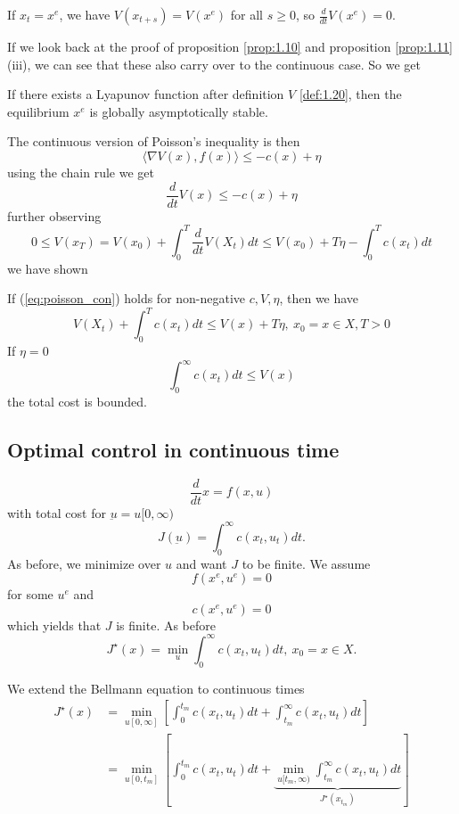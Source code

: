 If \(x_t=x^e\), we have \(V(x_{t+s})=V(x^e)\) for all \(s\geq 0\), so 
\(\frac{d}{dt}V(x^e)=0\).

If we look back at the proof of proposition \ref{prop:1.10} and proposition \ref{prop:1.11} (iii),
we can see that these also carry over to the continuous case. So we get 
\begin{proposition}\label{prop:1.21}
    If there exists a Lyapunov function after definition \(V\) \ref{def:1.20},
    then the equilibrium \(x^e\) is globally asymptotically stable.  
\end{proposition}  

The continuous version of Poisson's inequality is then 
\begin{equation}\label{eq:poisson_con}
    \langle \nabla V(x),f(x) \rangle \leq -c(x)+\eta
\end{equation}
using the chain rule we get 
\[\frac{d}{dt} V(x)\leq -c(x)+\eta \]
further observing \[0\leq V(x_T)=V(x_0)+\int_0^T \frac{d}{dt}V(X_t)dt\leq V(x_0)+T\eta-\int_0^T c(x_t)dt\]
we have shown
\begin{proposition}\label{prop:1.22}
    If (\ref{eq:poisson_con}) holds for non-negative \(c,V,\eta\), then we have 
    \begin{equation}\label{eq:comp_thm_cont}
        V(X_t)+\int_0^Tc(x_t)dt\leq V(x)+T\eta, \ x_0=x\in X,T>0 
    \end{equation}
    If \(\eta=0\)
    \[\int_0^\infty c(x_t)dt\leq V(x)\]
    the total cost is bounded.
\end{proposition}

\subsection{Optimal control in continuous time} 

\[\frac{d}{dt}x=f(x,u)\]
with total cost for \(\underbar{u}=u[0,\infty)\)
\[J(\underbar{u})=\int_0^\infty c(x_t,u_t)dt.\]
As before, we minimize over \(u\) and want \(J\) to be finite.
We assume \[f(x^e,u^e)=0\] for some \(u^e\) and 
\[c(x^e,u^e)=0\]
which yields that \(J\) is finite. As before 
\[J^\star(x)=\min_u \int_0^\infty c(x_t,u_t)dt,\ x_0=x\in X.\]

We extend the Bellmann equation to continuous times 
\begin{align*}
    J^\star(x)&=\min_{u[0,\infty]}\left[\int_0^{t_m} c(x_t,u_t)dt+\int_{t_m}^\infty c(x_t,u_t)dt\right]\\ %
    &= \min_{u[0,t_m]}\left[\int_0^{t_m} c(x_t,u_t)dt+\underbrace{\min_{u[t_m,\infty)}\int_{t_m}^\infty c(x_t,u_t)dt}_{J^\star(x_{t_m})}\right]
\end{align*}

